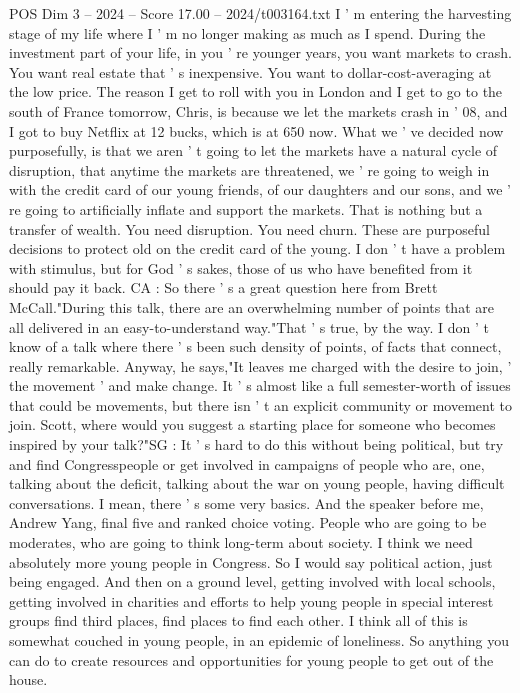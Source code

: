 \begin{textsample}{POS Dim 3 – 2024 – Score 17.00 – 2024/t003164.txt}
I ' m entering the harvesting stage of my life where I ' m no longer making as much as I spend.
During the investment part of your life, in you ' re younger years, you want markets to crash.
You want real estate that ' s inexpensive.
You want to dollar-cost-averaging at the low price.
The reason I get to roll with you in London and I get to go to the south of France tomorrow, Chris, is because we let the markets crash in ' 08, and I got to buy Netflix at 12 bucks, which is at 650 now.
What we ' ve decided now purposefully, is that we aren ' t going to let the markets have a natural cycle of disruption, that anytime the markets are threatened, we ' re going to weigh in with the credit card of our young friends, of our daughters and our sons, and we ' re going to artificially inflate and support the markets.
That is nothing but a transfer of wealth.
You need disruption.
You need churn.
These are purposeful decisions to protect old on the credit card of the young.
I don ' t have a problem with stimulus, but for God ' s sakes, those of us who have benefited from it should pay it back.
CA : So there ' s a great question here from Brett McCall."During this talk, there are an overwhelming number of points that are all delivered in an easy-to-understand way."That ' s true, by the way.
I don ' t know of a talk where there ' s been such density of points, of facts that connect, really remarkable.
Anyway, he says,"It leaves me charged with the desire to join, ' the movement ' and make change.
It ' s almost like a full semester-worth of issues that could be movements, but there isn ' t an explicit community or movement to join.
Scott, where would you suggest a starting place for someone who becomes inspired by your talk?"SG : It ' s hard to do this without being political, but try and find Congresspeople or get involved in campaigns of people who are, one, talking about the deficit, talking about the war on young people, having difficult conversations.
I mean, there ' s some very basics.
And the speaker before me, Andrew Yang, final five and ranked choice voting.
People who are going to be moderates, who are going to think long-term about society.
I think we need absolutely more young people in Congress.
So I would say political action, just being engaged.
And then on a ground level, getting involved with local schools, getting involved in charities and efforts to help young people in special interest groups find third places, find places to find each other.
I think all of this is somewhat couched in young people, in an epidemic of loneliness.
So anything you can do to create resources and opportunities for young people to get out of the house.

\end{textsample}
